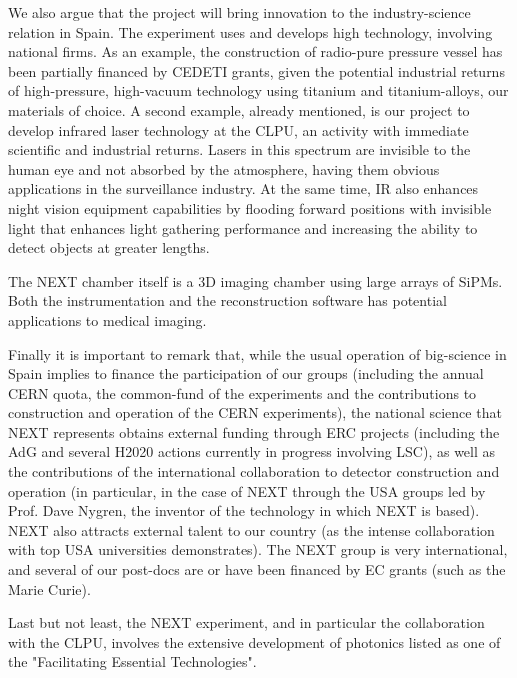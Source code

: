 We also argue that the project will bring innovation to the industry-science relation in Spain. The experiment uses and develops high technology, involving national firms. As an example, the construction of radio-pure pressure vessel has been partially financed by CEDETI grants, given the potential industrial returns of high-pressure, high-vacuum technology using titanium and titanium-alloys, our materials of choice. A second example, already mentioned, is our project to develop infrared laser technology at the CLPU, an activity with immediate scientific and industrial returns. Lasers in this spectrum are invisible to the human eye and not absorbed by the atmosphere, having them obvious applications in the surveillance industry. At the same time, IR also enhances night vision equipment capabilities by flooding forward positions with invisible light that enhances light gathering performance and increasing the ability to detect objects at greater lengths.

 The NEXT chamber itself is a 3D imaging chamber using large arrays of SiPMs. Both the instrumentation and the reconstruction software has potential applications to medical imaging. 

Finally it is important to remark that, while the usual operation of big-science in Spain implies to finance the participation of our groups (including the annual CERN quota, the common-fund of the experiments and the contributions to construction and operation of the CERN experiments), the national science that NEXT represents obtains external funding through ERC projects (including the AdG and several H2020 actions currently in progress involving LSC), as well as the contributions of the international collaboration to detector construction and operation (in particular, in the case of NEXT through the USA groups led by Prof. Dave Nygren, the inventor of the technology in which NEXT is based). NEXT also attracts external talent to our country (as the intense collaboration with top USA universities demonstrates). The NEXT group is very international, and several of our post-docs are or have been financed by EC grants (such as the Marie Curie). 

Last but not least, the NEXT experiment, and in particular the collaboration with the CLPU, involves the extensive development of photonics listed as one of the  "Facilitating Essential Technologies".